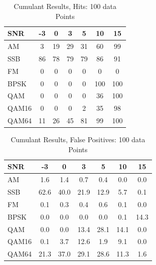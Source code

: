 \begin{table}
\caption{Cumulant Results, Hits: 100 data Points}
\centering
\begin{tabular}{ l | c | c | c | c | c | c } \hline
SNR   &	 -3 &	 0 &	 3 &	 5 &	 10 &	 15\\ \hline \hline 
AM    &	 3 &	 19 &	 29 &	 31 &	 60 &	 99 \\ \hline 
SSB   &	 86 &	 78 &	 79 &	 79 &	 86 &	 91 \\ \hline 
FM    &	 0 &	 0 &	 0 &	 0 &	 0 &	 0 \\ \hline 
BPSK  &	 0 &	 0 &	 0 &	 0 &	 100 &	 100 \\ \hline 
QAM   &	 0 &	 0 &	 0 &	 0 &	 36 &	 100 \\ \hline 
QAM16 &	 0 &	 0 &	 0 &	 2 &	 35 &	 98 \\ \hline 
QAM64 &	 11 &	 26 &	 45 &	 81 &	 99 &	 100 \\ \hline 
\end{tabular}
\label{tab:cumHit100pt}
\end{table}

\begin{table}
\caption{Cumulant Results, False Positives: 100 data Points}
\centering
\begin{tabular}{ l | c | c | c | c | c | c } \hline
SNR   &	 -3 &	 0 &	 3 &	 5 &	 10 &	 15\\ \hline \hline 
AM &	 1.6 &	 1.4 &	 0.7 &	 0.4 &	 0.0 &	 0.0 \\ \hline 
SSB &	 62.6 &	 40.0 &	 21.9 &	 12.9 &	 5.7 &	 0.1 \\ \hline 
FM &	 0.1 &	 0.3 &	 0.4 &	 0.6 &	 0.1 &	 0.0  \\ \hline 
BPSK &	 0.0 &	 0.0 &	 0.0 &	 0.0 &	 0.1 &	 14.3 \\ \hline 
QAM &	 0.0 &	 0.0 &	 13.4 &	 28.1 &	 14.1 &	 0.0 \\ \hline 
QAM16 &	 0.1 &	 3.7 &	 12.6 &	 1.9 &	 9.1 &	 0.0 \\ \hline 
QAM64 &	 21.3 &	 37.0 &	 29.1 &	 28.6 &	 11.3 &	 1.6 \\ \hline
\end{tabular}
\label{tab:cumFalsePositive100pt}
\end{table}


